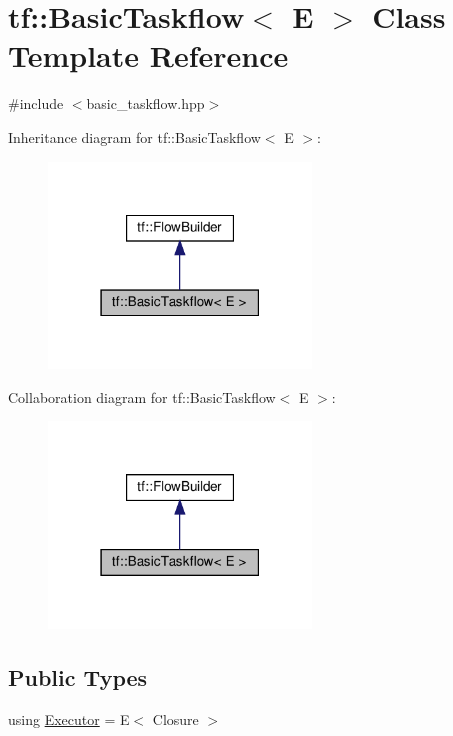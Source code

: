 \hypertarget{classtf_1_1BasicTaskflow}{}\section{tf\+:\+:Basic\+Taskflow$<$ E $>$ Class Template Reference}
\label{classtf_1_1BasicTaskflow}


{\ttfamily \#include $<$basic\+\_\+taskflow.\+hpp$>$}



Inheritance diagram for tf\+:\+:Basic\+Taskflow$<$ E $>$\+:\nopagebreak
\begin{figure}[H]
\begin{center}
\leavevmode
\includegraphics[width=198pt]{classtf_1_1BasicTaskflow__inherit__graph}
\end{center}
\end{figure}


Collaboration diagram for tf\+:\+:Basic\+Taskflow$<$ E $>$\+:\nopagebreak
\begin{figure}[H]
\begin{center}
\leavevmode
\includegraphics[width=198pt]{classtf_1_1BasicTaskflow__coll__graph}
\end{center}
\end{figure}
\subsection*{Public Types}
\begin{DoxyCompactItemize}
\item 
using \hyperlink{classtf_1_1BasicTaskflow_ab183cd063ba999ac62b5d4e9bb89247d}{Executor} = E$<$ Closure $>$
\end{DoxyCompactItemize}
